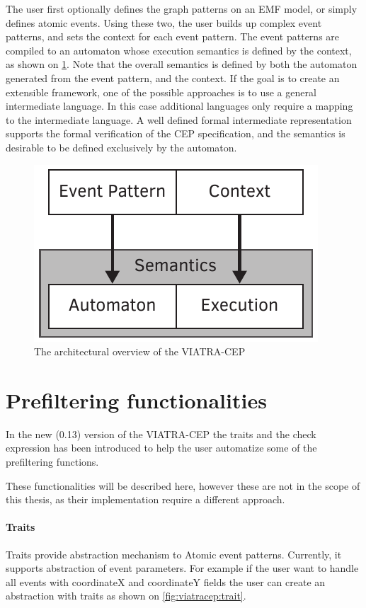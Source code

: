 The user first optionally defines the graph patterns on an EMF model, or simply defines atomic events.
Using these two, the user builds up complex event patterns, and sets the context for each event pattern. The event patterns are compiled to an automaton
whose execution semantics is defined by the context, as shown on \cref{fig:viatracep:oldcep}. 
Note that the overall semantics is defined by both the automaton generated from the event pattern, and the context.
If the goal is to create an extensible framework, one of the possible approaches is to use a general intermediate language. In this case additional languages only require a mapping to the intermediate language.
A well defined formal intermediate representation supports the formal verification of the CEP specification, and the semantics is desirable to be defined exclusively by the automaton.



\begin{figure}[h]
	\centering
	\includegraphics[width=0.4\linewidth]{figures/chapter_3/oldcep}
	\caption{The architectural overview of the VIATRA-CEP \redraw}
	\label{fig:viatracep:oldcep}
\end{figure}

\section{Prefiltering functionalities}
In the new (0.13) version of the VIATRA-CEP the traits and the check expression has been introduced to help the user automatize some of the prefiltering functions.

These functionalities will be described here, however these are not in the scope of this thesis, as their implementation require a different approach.

\paragraph{Traits}
Traits provide abstraction mechanism to Atomic event patterns. Currently, it supports abstraction of event parameters. For example if the user want to handle all events with coordinateX and coordinateY fields the user can create an abstraction with traits as shown on \cref{fig:viatracep:trait}.


